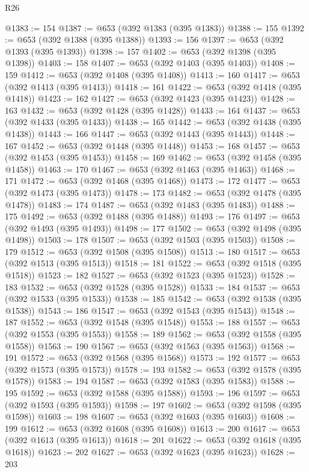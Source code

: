 \begin{lexlean}{R26}
\begin{coremodule}
@1383 := 154
@1387 := @653 (@392 @1383 (@395 @1383))
@1388 := 155
@1392 := @653 (@392 @1388 (@395 @1388))
@1393 := 156
@1397 := @653 (@392 @1393 (@395 @1393))
@1398 := 157
@1402 := @653 (@392 @1398 (@395 @1398))
@1403 := 158
@1407 := @653 (@392 @1403 (@395 @1403))
@1408 := 159
@1412 := @653 (@392 @1408 (@395 @1408))
@1413 := 160
@1417 := @653 (@392 @1413 (@395 @1413))
@1418 := 161
@1422 := @653 (@392 @1418 (@395 @1418))
@1423 := 162
@1427 := @653 (@392 @1423 (@395 @1423))
@1428 := 163
@1432 := @653 (@392 @1428 (@395 @1428))
@1433 := 164
@1437 := @653 (@392 @1433 (@395 @1433))
@1438 := 165
@1442 := @653 (@392 @1438 (@395 @1438))
@1443 := 166
@1447 := @653 (@392 @1443 (@395 @1443))
@1448 := 167
@1452 := @653 (@392 @1448 (@395 @1448))
@1453 := 168
@1457 := @653 (@392 @1453 (@395 @1453))
@1458 := 169
@1462 := @653 (@392 @1458 (@395 @1458))
@1463 := 170
@1467 := @653 (@392 @1463 (@395 @1463))
@1468 := 171
@1472 := @653 (@392 @1468 (@395 @1468))
@1473 := 172
@1477 := @653 (@392 @1473 (@395 @1473))
@1478 := 173
@1482 := @653 (@392 @1478 (@395 @1478))
@1483 := 174
@1487 := @653 (@392 @1483 (@395 @1483))
@1488 := 175
@1492 := @653 (@392 @1488 (@395 @1488))
@1493 := 176
@1497 := @653 (@392 @1493 (@395 @1493))
@1498 := 177
@1502 := @653 (@392 @1498 (@395 @1498))
@1503 := 178
@1507 := @653 (@392 @1503 (@395 @1503))
@1508 := 179
@1512 := @653 (@392 @1508 (@395 @1508))
@1513 := 180
@1517 := @653 (@392 @1513 (@395 @1513))
@1518 := 181
@1522 := @653 (@392 @1518 (@395 @1518))
@1523 := 182
@1527 := @653 (@392 @1523 (@395 @1523))
@1528 := 183
@1532 := @653 (@392 @1528 (@395 @1528))
@1533 := 184
@1537 := @653 (@392 @1533 (@395 @1533))
@1538 := 185
@1542 := @653 (@392 @1538 (@395 @1538))
@1543 := 186
@1547 := @653 (@392 @1543 (@395 @1543))
@1548 := 187
@1552 := @653 (@392 @1548 (@395 @1548))
@1553 := 188
@1557 := @653 (@392 @1553 (@395 @1553))
@1558 := 189
@1562 := @653 (@392 @1558 (@395 @1558))
@1563 := 190
@1567 := @653 (@392 @1563 (@395 @1563))
@1568 := 191
@1572 := @653 (@392 @1568 (@395 @1568))
@1573 := 192
@1577 := @653 (@392 @1573 (@395 @1573))
@1578 := 193
@1582 := @653 (@392 @1578 (@395 @1578))
@1583 := 194
@1587 := @653 (@392 @1583 (@395 @1583))
@1588 := 195
@1592 := @653 (@392 @1588 (@395 @1588))
@1593 := 196
@1597 := @653 (@392 @1593 (@395 @1593))
@1598 := 197
@1602 := @653 (@392 @1598 (@395 @1598))
@1603 := 198
@1607 := @653 (@392 @1603 (@395 @1603))
@1608 := 199
@1612 := @653 (@392 @1608 (@395 @1608))
@1613 := 200
@1617 := @653 (@392 @1613 (@395 @1613))
@1618 := 201
@1622 := @653 (@392 @1618 (@395 @1618))
@1623 := 202
@1627 := @653 (@392 @1623 (@395 @1623))
@1628 := 203

\end{coremodule}
\end{lexlean}

